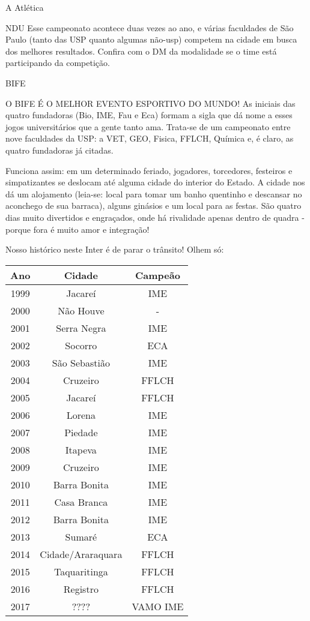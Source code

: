 \begin{secao}{A Atlética}
\begin{subsecao}{NDU}
Esse campeonato acontece duas vezes ao ano, e várias faculdades de São Paulo
(tanto das USP quanto algumas não-usp) competem na cidade em busca dos melhores
resultados. Confira com o DM da modalidade se o time está participando da
competição.

\end{subsecao}
\begin{subsecao}{BIFE}

O BIFE É O MELHOR EVENTO ESPORTIVO DO MUNDO! As iniciais das quatro fundadoras
(Bio, IME, Fau e Eca) formam a sigla que dá nome a esses jogos universitários
que a gente tanto ama. Trata-se de um campeonato entre nove faculdades da USP:
a VET, GEO, Fisica, FFLCH, Química e, é claro, as quatro fundadoras já citadas.

Funciona assim: em um determinado feriado, jogadores, torcedores, festeiros e
simpatizantes se deslocam até alguma cidade do interior do Estado. A cidade nos
dá um alojamento (leia-se: local para tomar um banho quentinho e descansar no
aconchego de sua barraca), alguns ginásios e um local para as festas. São
quatro dias muito divertidos e engraçados, onde há rivalidade apenas dentro de
quadra - porque fora é muito amor e integração!

Nosso histórico neste Inter é de parar o trânsito! Olhem só:

\begin{center}
  \begin{tabular}{c|c|c}
   Ano & Cidade & Campeão\\
   \hline
   1999 & Jacareí & IME\\
   2000 & Não Houve & - \\
   2001 & Serra Negra & IME\\
   2002 & Socorro & ECA\\
   2003 & São Sebastião & IME\\
   2004 & Cruzeiro & FFLCH\\
   2005 & Jacareí & FFLCH\\
   2006 & Lorena & IME\\
   2007 & Piedade & IME\\
   2008 & Itapeva & IME\\
   2009 & Cruzeiro & IME\\
   2010 & Barra Bonita & IME\\
   2011 & Casa Branca & IME\\
   2012 & Barra Bonita & IME\\
   2013 & Sumaré & ECA\\
   2014 & Cidade/Araraquara & FFLCH\\
   2015 & Taquaritinga & FFLCH\\
   2016 & Registro & FFLCH\\
   2017 & ???? & VAMO IME
  \end{tabular}
\end{center}


\end{subsecao}
\end{secao}
